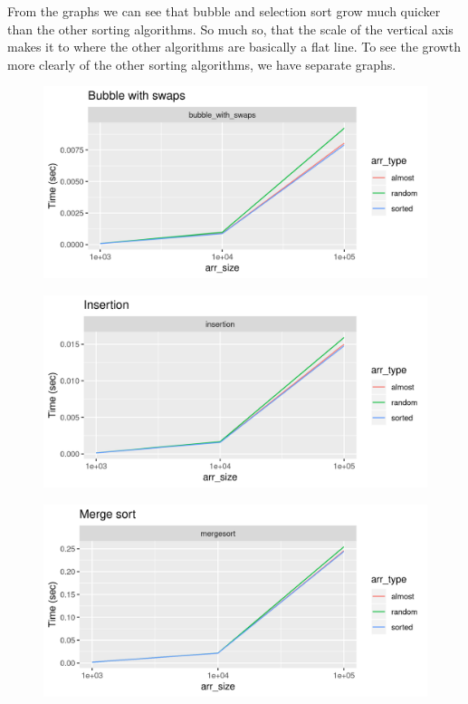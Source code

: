 \documentclass[letterpaper, 11pt]{article}
\begin{document}
From the graphs we can see that bubble and selection sort grow much
quicker than the other sorting algorithms. So much so, that the scale of the
vertical axis makes it to where the other algorithms are basically a flat line.
To see the growth more clearly of the other sorting algorithms, we have separate
graphs. 

\begin{figure}[ht]
  \includegraphics[width=\linewidth]{bubble_with_swaps.png}
\end{figure}

\begin{figure}[ht]
  \includegraphics[width=\linewidth]{insertion.png}
\end{figure}

\begin{figure}[t]
  \includegraphics[width=\linewidth]{mergesort.png}
\end{figure}
\end{document}
